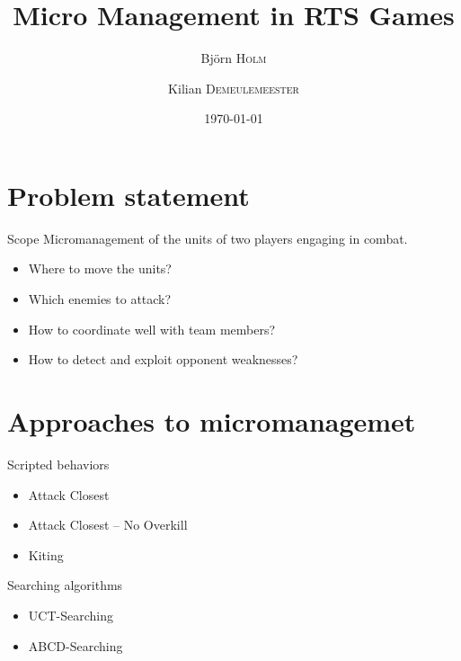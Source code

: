 \documentclass{beamer}
\title{Micro Management in RTS Games}
\author{Björn \textsc{Holm}
    \and
Kilian \textsc{Demeulemeester}}
\date{\today}
\newenvironment{framesec}{
    \begin{frame}{\secname}
}{\end{frame}}
\begin{document}
\begin{frame}
    \maketitle
\end{frame}
\begin{frame}
    \tableofcontents
\end{frame}

\section{Problem statement}
\begin{framesec}
    \begin{block}{Scope} 
       Micromanagement of the units of two players engaging in combat.
    \end{block}  
    \begin{itemize}
        \item Where to move the units?
        \item Which enemies to attack?
        \item How to coordinate well with team members?
        \item How to detect and exploit opponent weaknesses?
    \end{itemize}
\end{framesec}

\section{Approaches to micromanagemet}
\begin{framesec}
    \begin{block}{Scripted behaviors}
        \begin{itemize}
            \item Attack Closest
            \item Attack Closest -- No Overkill
            \item Kiting
        \end{itemize}
    \end{block}
    \begin{block}{Searching algorithms}
        \begin{itemize}
            \item UCT-Searching
            \item ABCD-Searching
        \end{itemize}
    \end{block}
\end{framesec}
\end{document}
